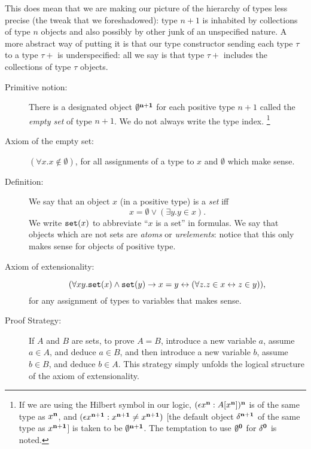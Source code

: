 \documentclass[12pt]{book}
\begin{document}
This does mean that we are making our picture of the hierarchy of
types less precise (the tweak that we foreshadowed): type $n+1$ is inhabited by collections of type $n$
objects and also possibly by other junk of an unspecified nature.  A more abstract way of putting it is that our type constructor sending each type $\tau$ to a type $\tau+$ is underspecified:  all we say is that type $\tau+$ includes the collections of type $\tau$ objects.

\begin{description}

\item[Primitive notion:] There is a designated object $\emptyset^{\bf
n+1}$ for each positive type $n+1$ called the {\em empty set\/} of
type $n+1$.  We do not always write the type index.  \footnote{ If we are using the Hilbert symbol in our logic, $(\epsilon x^{\bf n}:A[x^{\bf n}])^{\bf n}$ is of the same type as $x^{\bf n}$, and $(\epsilon x^{\bf n+1}:x^{\bf n+1} \neq x^{\bf n+1})$ [the default object $\delta^{\bf n+1}$ of the same type as $x^{\bf n+1}$] is taken to be $\emptyset^{\bf n+1}$.  The temptation to use $\emptyset^{\bf 0}$ for $\delta^{\bf 0}$ is noted.}

\item[Axiom of the empty set:] $(\forall x.x\not\in \emptyset)$, for
all assignments of a type to $x$ and $\emptyset$ which make sense.

\item[Definition:] We say that an object $x$ (in a positive type) is a
{\em set\/} iff $$x = \emptyset \vee (\exists y.y \in x).$$  We write
${\tt set}(x)$ to abbreviate ``$x$ is a set'' in formulas.  We say
that objects which are not sets are {\em atoms} or {\em urelements\/}:  notice that this only makes sense for objects of positive type.

\item[Axiom of extensionality:] $$(\forall xy.{\tt set}(x) \wedge {\tt
set}(y) \rightarrow x=y\leftrightarrow (\forall z.z\in x
\leftrightarrow z\in y)),$$ for any assignment of types to variables that makes sense.

\item[Proof Strategy:] If $A$ and $B$ are sets, to prove $A=B$,
introduce a new variable $a$, assume $a \in A$, and deduce $a \in B$,
and then introduce a new variable $b$, assume $b \in B$, and deduce $b
\in A$.  This strategy simply unfolds the logical structure of the
axiom of extensionality.

\end{description}
\end{document}
